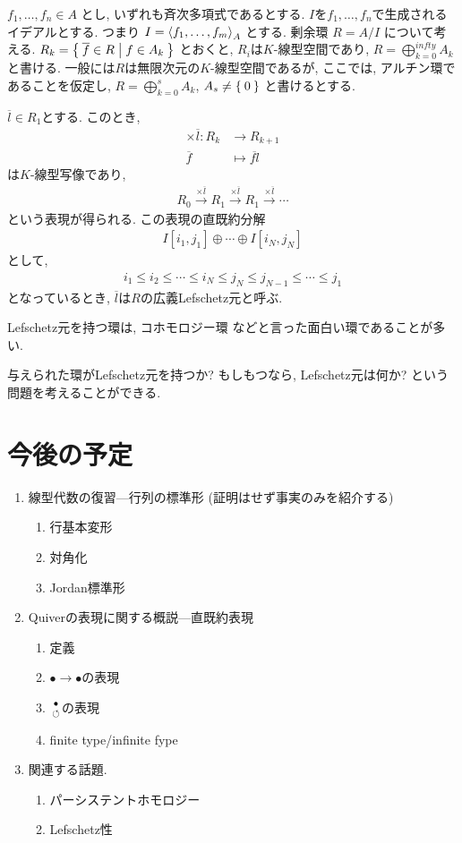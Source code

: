 $f_1,\ldots, f_n\in A$
とし, いずれも斉次多項式であるとする.
$I$を$f_1,\ldots, f_n$で生成されるイデアルとする.
つまり
$I=\Braket{f_1,\ldots,f_m}_{A}$
とする.
剰余環
$R=A/I$
について考える.
$R_k=\Set{\overline{f}\in R|f\in A_k}$
とおくと,
$R_i$は$K$-線型空間であり,
$R=\bigoplus_{k=0}^{infty}A_k$
と書ける.
一般には$R$は無限次元の$K$-線型空間であるが,
ここでは,
アルチン環であることを仮定し,
$R=\bigoplus_{k=0}^{s}A_k$, $A_s\neq \Set{0}$
と書けるとする.

$\overline{l}\in R_1$とする.
このとき,
\begin{align*}
  \times \overline{l}\colon
R_{k}&\to R_{k+1}  \\
\overline{f}&\mapsto \overline{fl}
\end{align*}
は$K$-線型写像であり,
\begin{align*}
  R_0\xrightarrow{\times\overline{l}}
  R_1\xrightarrow{\times\overline{l}}
  R_1\xrightarrow{\times\overline{l}}\cdots
\end{align*}
という表現が得られる.
この表現の直既約分解
\begin{align*}
  I[i_1,j_1]\oplus \cdots\oplus I[i_N,j_N]
\end{align*}
として,
\begin{align*}
  i_1\leq i_2 \leq \cdots\leq i_N \leq j_N \leq j_{N-1} \leq \cdots \leq j_1
\end{align*}
となっているとき,
$\overline{l}$は$R$の広義Lefschetz元と呼ぶ.

Lefschetz元を持つ環は,
コホモロジー環
などと言った面白い環であることが多い.

与えられた環がLefschetz元を持つか?
もしもつなら, Lefschetz元は何か?
という問題を考えることができる.

\section{今後の予定}
\begin{enumerate}
\item 線型代数の復習---行列の標準形 (証明はせず事実のみを紹介する)
  \begin{enumerate}
  \item 行基本変形
  \item 対角化
  \item Jordan標準形
  \end{enumerate}
\item Quiverの表現に関する概説---直既約表現
  \begin{enumerate}
  \item 定義
  \item $\bullet \to \bullet$の表現
  \item $\genfrac{}{}{0pt}{}{\bullet}{\circlearrowleft}$の表現
  \item finite type/infinite fype
  \end{enumerate}
\item
  関連する話題.
  \begin{enumerate}
  \item パーシステントホモロジー
  \item Lefschetz性
  \end{enumerate}
\end{enumerate}

